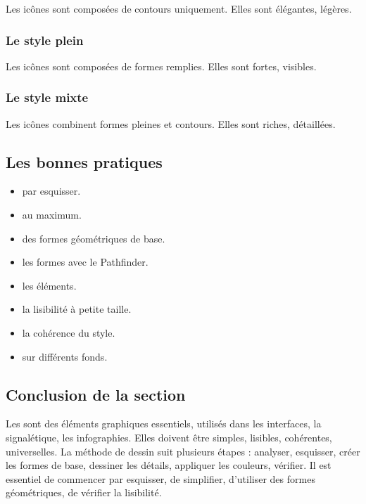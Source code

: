 Les icônes  sont composées de contours uniquement. Elles sont élégantes, légères.

\subsubsection{Le style plein}

Les icônes  sont composées de formes remplies. Elles sont fortes, visibles.

\subsubsection{Le style mixte}

Les icônes  combinent formes pleines et contours. Elles sont riches, détaillées.

\subsection{Les bonnes pratiques}

\begin{itemize}
    \item {} par esquisser.
    \item {} au maximum.
    \item {} des formes géométriques de base.
    \item {} les formes avec le Pathfinder.
    \item {} les éléments.
    \item {} la lisibilité à petite taille.
    \item {} la cohérence du style.
    \item {} sur différents fonds.
\end{itemize}

\subsection*{Conclusion de la section}

Les  sont des éléments graphiques essentiels, utilisés dans les interfaces, la signalétique, les infographies. Elles doivent être simples, lisibles, cohérentes, universelles. La méthode de dessin suit plusieurs étapes : analyser, esquisser, créer les formes de base, dessiner les détails, appliquer les couleurs, vérifier. Il est essentiel de commencer par esquisser, de simplifier, d'utiliser des formes géométriques, de vérifier la lisibilité.

